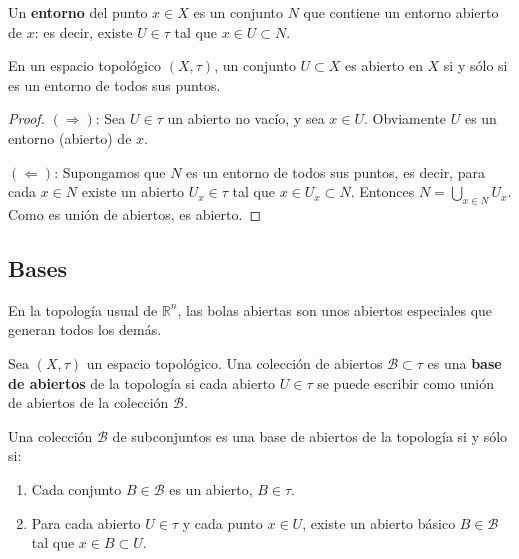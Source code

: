 
\begin{definición}[Entorno]
    Un \textbf{entorno} del punto $x \in X$ es un conjunto $N$ que contiene un entorno abierto de $x$: es decir, existe $U \in \tau$ tal que $x \in U \subset N$.
\end{definición}


\begin{proposición}
    En un espacio topológico $(X, \tau)$, un conjunto $U \subset X$ es abierto en $X$ si y sólo si es un entorno de todos sus puntos.
\end{proposición}
\begin{proof}
    $(\Rightarrow)$: Sea $U \in \tau$ un abierto no vacío, y sea $x \in U$. Obviamente $U$ es un entorno (abierto) de $x$.

    $(\Leftarrow)$: Supongamos que $N$ es un entorno de todos sus puntos, es decir, para cada $x \in N$ existe un abierto $U_x \in \tau$ tal que $x \in U_x \subset N$. Entonces $N = \bigcup_{x \in N} U_x$. Como es unión de abiertos, es abierto.
\end{proof}

\subsection{Bases}

En la topología usual de $\mathbb{R}^n$, las bolas abiertas son unos abiertos especiales que generan todos los demás.

\begin{definición}
    Sea $(X, \tau)$ un espacio topológico. Una colección de abiertos $\mathcal{B} \subset \tau$ es una \textbf{base de abiertos} de la topología si cada abierto $U \in \tau$ se puede escribir como unión de abiertos de la colección $\mathcal{B}$.
\end{definición}

\begin{proposición}
    Una colección $\mathcal{B}$ de subconjuntos es una base de abiertos de la topología si y sólo si:
    \begin{enumerate}
        \item Cada conjunto $B \in \mathcal{B}$ es un abierto, $B \in \tau$.
        \item Para cada abierto $U \in \tau$ y cada punto $x \in U$, existe un abierto básico $B \in \mathcal{B}$ tal que $x \in B \subset U$.
    \end{enumerate}
\end{proposición}

